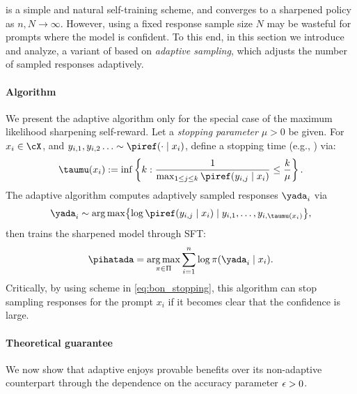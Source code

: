 



  \bestofnalg is a simple and natural self-training scheme, and
  converges to a sharpened policy as $n, N\to \infty$. However, using
  a fixed response sample size $N$ may be wasteful for prompts where
  the model is confident. To this end, in this section we introduce
  and analyze, a variant of
  \bestofnalg based on \emph{adaptive sampling}, which adjusts the
  number of sampled responses adaptively.



  \paragraph{Algorithm}
  We present the adaptive \bestofnalg algorithm only for the special case of the
  maximum likelihood sharpening self-reward. Let a \emph{stopping parameter} $\mu>0$ be given. For $x_i\in\cX$,
  and $y_{i,1},y_{i,2}\ldots\sim\piref(\cdot\mid{}x_i)$, define a
  stopping time (e.g., \iftoggle{workshop}{\cite{benjamini1995controlling}}{ \citet{benjamini1995controlling}}) via:
  \begin{align}
    \label{eq:bon_stopping}
    \taumu(x_i) := \inf \left\{k : \frac{1}{\max_{1 \le j \le k} \piref(y_{i,j}\mid{}x_i)} \le \frac{k}{\mu} \right\}.
  \end{align}
  The adaptive \bestofnalg algorithm computes adaptively sampled
  responses $\yada_i$ via
  \[
    \yada_i\sim\argmax\crl*{\log\piref(y_{i,j}\mid{}x_i)\mid{}y_{i,1},\ldots,y_{i,\taumu(x_i)}},
  \]
  then trains the sharpened model through SFT:
  \[
    \pihatada =
    \argmax_{\pi\in\Pi}\sum_{i=1}^{n}\log\pi(\yada_i\mid{}x_i).
  \]
  Critically,
  by using scheme in \cref{eq:bon_stopping}, this algorithm can stop
  sampling responses for the prompt $x_i$ if it becomes clear that the
  confidence is large.

\paragraph{Theoretical guarantee}  

We now show that adaptive \bestofnalg enjoys provable benefits over
its non-adaptive counterpart through the dependence on the accuracy
parameter $\epsilon>0$.  


